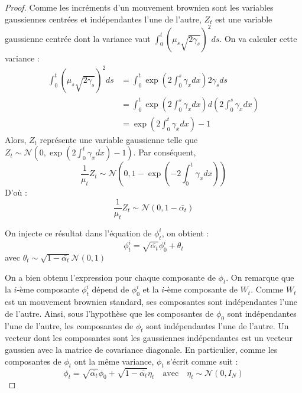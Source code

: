 \documentclass[a4paper,10pt]{article}
\theoremstyle{definition} %
\theoremstyle{definition} %
\theoremstyle{definition} %
\theoremstyle{definition} %
\begin{document}
\begin{proof}
    Comme les incréments d'un mouvement brownien sont les variables gaussiennes centrées et indépendantes l'une de l'autre, $Z_t$ est une variable gaussienne centrée dont la variance vaut $\int_0^t(\mu_s\sqrt{2\gamma_s})^2 ds $. On va calculer cette variance :
    \begin{align*}
        \int_0^t(\mu_s\sqrt{2\gamma_s})^2ds &= \int_0^t \exp(2 \int_0^s \gamma_xdx) 2 \gamma_s ds \\ 
        &=\int_0^t \exp(2 \int_0^s \gamma_xdx) d(2 \int_0^s \gamma_xdx)\\
        &= \exp(2 \int_0^t \gamma_xdx) -1
    \end{align*}
    Alors, $Z_t$ représente une variable gaussienne telle que  $Z_t \sim \mathcal{N}\left(0, \exp(2 \int_0^t \gamma_xdx) -1\right) $. Par conséquent, 
    \[\frac{1}{\mu_t}Z_t \sim \mathcal{N}\left(0, 1-\exp(-2 \int_0^t \gamma_xdx)\right)\]
    D'où :
    \[\frac{1}{\mu_t}Z_t \sim \mathcal{N}\left(0, 1-\bar{\alpha_t}\right)\]

    On injecte ce résultat dans l'équation de $\phi_t^i$, on obtient :
    \[\phi_t^i = \sqrt{\bar{\alpha_t}}\phi_0^i + \theta_t\]
    avec $\theta_t \sim \sqrt{1-\bar{\alpha_t}}\mathcal{N}\left(0, 1\right)$

    On a bien obtenu l'expression pour chaque composante de $\phi_t$. On remarque que la $i$-ème composante $\phi_t^i$ dépend de $\phi_0^i$ et la $i$-ème composante de $W_t$. Comme $W_t$ est un mouvement brownien standard, ses composantes sont indépendantes l'une de l'autre. Ainsi, sous l'hypothèse que les composantes de $\phi_0$ sont indépendantes l'une de l'autre, les composantes de $\phi_t$ sont indépendantes l'une de l'autre. Un vecteur dont les composantes sont les gaussiennes indépendantes est un vecteur gaussien avec la matrice de covariance diagonale. En particulier, comme les composantes de $\phi_t$ ont la même variance, $\phi_t$ s'écrit comme suit :
    \[\phi_t = \sqrt{\bar{\alpha_t}}\phi_0 + \sqrt{1-\bar{\alpha_t}}\eta_t \quad \text{avec} \quad \eta_t \sim \mathcal{N}(0, I_N)\] 
\end{proof}





 
\end{document}
